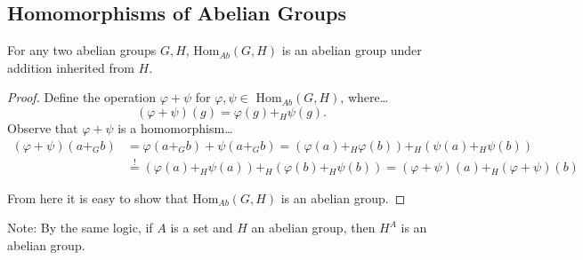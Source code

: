 \subsection{Homomorphisms of Abelian Groups}\label{abeliangrouphomomorphism}

\begin{proposition}
For any two abelian groups $G,H$, Hom$_{Ab}(G,H)$ is an abelian group under addition inherited from $H$.
\end{proposition}

\begin{proof}
Define the operation $\varphi + \psi$ for $\varphi, \psi \in$ Hom$_{Ab}(G,H)$, where\dots
$$(\varphi + \psi)(g) = \varphi(g) +_H \psi(g).$$
Observe that $\varphi + \psi$ is a homomorphism\dots
\begin{align*}
	(\varphi + \psi)(a +_G b) &= \varphi(a +_G b) + \psi(a +_G b) = (\varphi(a) +_H \varphi(b)) +_H (\psi(a) +_H \psi(b))\\
							  &\overset{!}{=} (\varphi(a) +_H \psi(a)) +_H (\varphi(b) +_H \psi(b)) = (\varphi + \psi)(a) +_H (\varphi + \psi)(b)
\end{align*}

\noindent From here it is easy to show that Hom$_{Ab}(G,H)$ is an abelian group.
\end{proof}

\noindent Note: By the same logic, if $A$ is a set and $H$ an abelian group, then $H^A$ is an abelian group.
 